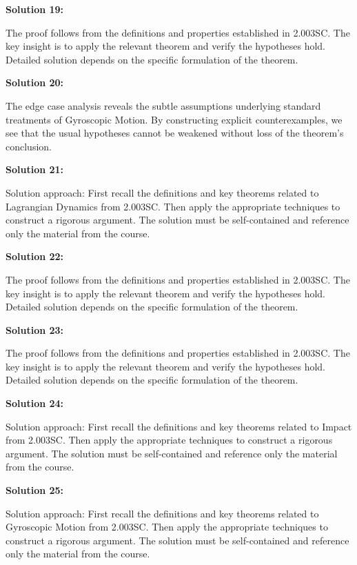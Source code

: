 \documentclass[12pt,a4paper]{exam}
\begin{document}
\vspace{0.5cm}

\textbf{Solution 19:}

The proof follows from the definitions and properties established in 2.003SC. The key insight is to apply the relevant theorem and verify the hypotheses hold. Detailed solution depends on the specific formulation of the theorem.

\vspace{0.5cm}

\textbf{Solution 20:}

The edge case analysis reveals the subtle assumptions underlying standard treatments of Gyroscopic Motion. By constructing explicit counterexamples, we see that the usual hypotheses cannot be weakened without loss of the theorem's conclusion.

\vspace{0.5cm}

\textbf{Solution 21:}

Solution approach: First recall the definitions and key theorems related to Lagrangian Dynamics from 2.003SC. Then apply the appropriate techniques to construct a rigorous argument. The solution must be self-contained and reference only the material from the course.

\vspace{0.5cm}

\textbf{Solution 22:}

The proof follows from the definitions and properties established in 2.003SC. The key insight is to apply the relevant theorem and verify the hypotheses hold. Detailed solution depends on the specific formulation of the theorem.

\vspace{0.5cm}

\textbf{Solution 23:}

The proof follows from the definitions and properties established in 2.003SC. The key insight is to apply the relevant theorem and verify the hypotheses hold. Detailed solution depends on the specific formulation of the theorem.

\vspace{0.5cm}

\textbf{Solution 24:}

Solution approach: First recall the definitions and key theorems related to Impact from 2.003SC. Then apply the appropriate techniques to construct a rigorous argument. The solution must be self-contained and reference only the material from the course.

\vspace{0.5cm}

\textbf{Solution 25:}

Solution approach: First recall the definitions and key theorems related to Gyroscopic Motion from 2.003SC. Then apply the appropriate techniques to construct a rigorous argument. The solution must be self-contained and reference only the material from the course.

\vspace{0.5cm}
\end{document}
